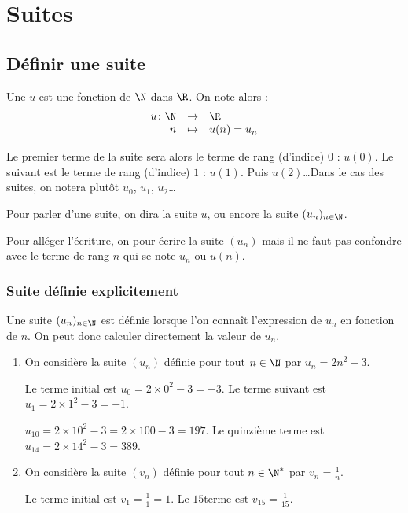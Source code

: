 \documentclass[10pt,openright,twoside,french]{book}
\begin{document}
\chapter{Suites}\label{ch_suite}

\section{Définir une suite}
\begin{Defi}
    Une  $u$ est une fonction de $\N$ dans $\R$. On note alors :
    \[\begin{array}{rcl}
        u\colon \N & \to & \R \\
        n & \mapsto & u(n) = u_n
    \end{array}\]
\end{Defi}\medskip

\begin{Rmq}
    Le premier terme de la suite sera alors le terme de rang (d'indice) $0$ : $u(0)$. Le suivant est le terme de rang (d'indice) $1$ : $u(1)$. Puis $u(2)$\ldots Dans le cas des suites, on notera plutôt $u_0$, $u_1$, $u_2$\ldots\par
    Pour parler d'une suite, on dira la suite $u$, ou encore la suite $(u_n)_{n \in \N}$.\par
    Pour alléger l'écriture, on pour écrire la suite $(u_n)$ mais il ne faut pas confondre avec le terme de rang $n$ qui se note $u_n$ ou $u(n)$.
\end{Rmq}

\subsection{Suite définie explicitement}

\begin{Defi}
    Une suite $(u_n)_{n\in \N}$ est définie  lorsque l'on connaît l'expression de $u_n$ en fonction de $n$. On peut donc calculer directement la valeur de $u_n$.
\end{Defi}

\begin{Exemple}[s]
     \begin{enumerate}
        \item On considère la suite $(u_n)$ définie pour tout $n \in \N$ par $u_n = 2n^2 - 3$.\par
        Le terme initial est $u_0 = 2 \times 0^2 - 3 = -3$. Le terme suivant est $u_1 = 2 \times 1^2 - 3 = -1$.\par
        $u_{10} = 2 \times 10^2 - 3 = 2 \times 100 - 3 = 197$.
        Le quinzième terme est $u_{14} = 2 \times 14^2 - 3 = 389$.
        \item On considère la suite $(v_n)$ définie pour tout $n \in \N^*$ par $v_n = \frac1n$.\par
        Le terme initial est $v_1 = \frac 1 1 = 1$. Le $15$\ieme terme est $v_{15} = \frac{1}{15}$.
     \end{enumerate}
\end{Exemple}
\end{document}
